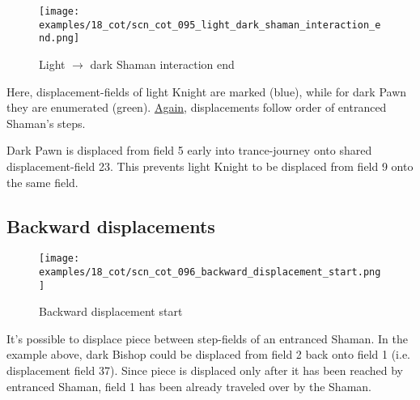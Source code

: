 \clearpage %

\noindent
\begin{figure}[!h]
\texttt{[image: examples/18\_cot/scn\_cot\_095\_light\_dark\_shaman\_interaction\_end.png]}
\caption{Light $\rightarrow$ dark Shaman interaction end}
\label{fig:scn_cot_095_light_dark_shaman_interaction_end}
\end{figure}

Here, displacement-fields of light Knight are marked (blue), while for dark Pawn
they are enumerated (green).
\hyperref[fig:scn_cot_087_light_light_shaman_interaction_end]{Again}, displacements
follow order of entranced Shaman's steps.

Dark Pawn is displaced from field 5 early into trance-journey onto shared
displacement-field 23. This prevents light Knight to be displaced from field 9
onto the same field.

\clearpage %

\subsection*{Backward displacements}
\label{sec:Conquest of Tlalocan/Trance-journey/Backward displacements}

\noindent
\begin{figure}[!h]
\vspace{-1.0\baselineskip}
\texttt{[image: examples/18\_cot/scn\_cot\_096\_backward\_displacement\_start.png]}
\caption{Backward displacement start}
\label{fig:scn_cot_096_backward_displacement_start}
\end{figure}

It's possible to displace piece between step-fields of an entranced Shaman. In the
example above, dark Bishop could be displaced from field 2 back onto field 1 (i.e.
displacement field 37). Since piece is displaced only after it has been reached by
entranced Shaman, field 1 has been already traveled over by the Shaman.

\clearpage %

